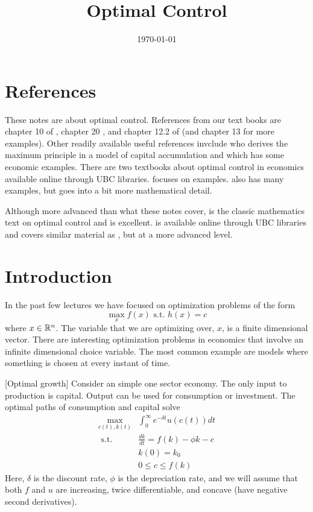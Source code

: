  

\title{Optimal Control}
\date{\today}



\maketitle

\section{References}

These notes are about optimal control.  References from our text books
are chapter 10 of \cite{dixit1990}, chapter 20 \cite{cw2005}, and
chapter 12.2 of \cite{fuente2000} (and chapter 13 for more
examples). Other readily available useful references invclude
\cite{dorfman1969} who derives the maximum principle in a model of capital
accumulation and \cite{intriligator1975} which has some economic
examples. There are two textbooks about optimal control in economics
available online through UBC libraries. \cite{sethi2000} focuses on
examples. \cite{caputo2005} also has many examples, but goes into a
bit more mathematical detail.

Although more advanced than what these notes cover,
\cite{luenberger1969} is the classic mathematics text on optimal
control and is excellent. \cite{clarke2013} is available online
through UBC libraries and covers similar material as
\cite{luenberger1969}, but at a more advanced level. 


\section{Introduction}

In the past few lectures we have focused on optimization problems of the form 
\[ \max_{x} f(x) \text{ s.t. } h(x) = c \]
where $x \in\mathbb{R}^n$. The variable that we are optimizing over,
$x$, is a finite dimensional vector. There are interesting
optimization problems in economics that involve an infinite
dimensional choice variable. The most common example are models where
something is chosen at every instant of time.
\begin{example}\label{ex:grow}[Optimal growth]
  Consider an simple one sector economy. The only input to
  production is capital. Output can be used for consumption or
  investment. The optimal paths of consumption and capital solve
  \begin{align*}
    \max_{c(t),k(t)} & \int_0^\infty e^{-\delta t} u(c(t)) dt \\
    \text{ s.t. } & \frac{dk}{dt} = f(k) - \phi k - c \\
    & k(0) = k_0 \\
    & 0 \leq c \leq f(k)
  \end{align*}
  Here, $\delta$ is the discount rate, $\phi$ is the depreciation
  rate, and we will assume that both $f$ and $u$ are increasing, twice
  differentiable, and concave (have negative second derivatives).   
\end{example}

